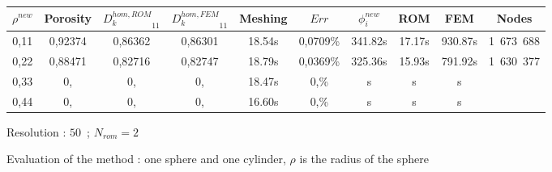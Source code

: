 {\begin{figure}[H]%
%
\begin{center}
\begin{tabular}{|c|c||c|c||c|c||c|c||c||c|}
\hline
\rowcolor{lightgray} $\rho^{new}$&Porosity&${D_k^{hom,ROM}}_{11}$&${D_k^{hom,FEM}}_{11}$&Meshing&$Err$&$\phi_i^{new}$&ROM&FEM&Nodes\\
\hline
0,11&0,92374&0,86362&0,86301&18.54s&0,0709\%&341.82s&17.17s&930.87s&1\ 673\ 688\\
\hline
0,22&0,88471&0,82716&0,82747&18.79s&0,0369\%&325.36s&15.93s&791.92s&1\ 630\ 377\\
\hline
0,33&0,&0,&0,&18.47s&0,\%&s&s&s&\\
\hline
0,44&0,&0,&0,&16.60s&0,\%&s&s&s&\\
\hline
\end{tabular}
\end{center}
\caption{Resolution : $50$\ ; $N_{rom}=2$}
%
\end{figure}

\ligneinter

\begin{figure}[H]%
%
\begin{table}[H]
\begin{center}
%
%
\qquad
{}%
%
\end{center}
\end{table}
%
\caption{Evaluation of the method : one sphere and one cylinder, $\rho$ is the radius of the sphere}
\end{figure}

}
